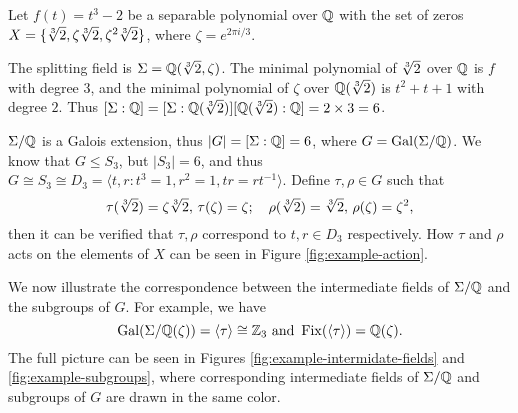 \begin{example}
	
	Let $f(t) = t^3 - 2$ be a separable polynomial over $\mathbb Q$ with the set of zeros $X = \{ \sqrt[3]{2}, \zeta \sqrt[3]{2}, \zeta^2 \sqrt[3]{2} \}$, where $\zeta = e^{2\pi i / 3}$. 
	
	The splitting field is $\Sigma = \mathbb Q(\sqrt[3]{2}, \zeta)$. The minimal polynomial of $\sqrt[3]{2}$ over $\mathbb Q$ is $f$ with degree $3$, and the minimal polynomial of $\zeta$ over $\mathbb Q(\sqrt[3]{2})$ is $t^2 + t + 1$ with degree $2$. Thus $[\Sigma : \mathbb Q] = [\Sigma : \mathbb Q(\sqrt[3]{2})] [\mathbb Q(\sqrt[3]{2}) : \mathbb Q] = 2 \times 3 = 6$. 
	
	$\Sigma / \mathbb Q$ is a Galois extension, thus $|G| = [\Sigma : \mathbb Q] = 6$, where $G = \operatorname{Gal}(\Sigma / \mathbb Q)$. We know that $G \le S_3$, but $|S_3| = 6$, and thus $G \cong S_3 \cong D_3 = \langle t, r : t^3 = 1, r^2 = 1, tr = rt^{-1} \rangle$. Define $\tau, \rho \in G$ such that 
	$$
		\tau(\sqrt[3]{2}) = \zeta \sqrt[3]{2}, \, \tau(\zeta) = \zeta; \quad \rho(\sqrt[3]{2}) = \sqrt[3]{2}, \,  \rho(\zeta) = \zeta ^ 2,
	$$
	then it can be verified that $\tau, \rho$ correspond to $t, r \in D_3$ respectively. How $\tau$ and $\rho$ acts on the elements of $X$ can be seen in Figure \ref{fig:example-action}.
	
	We now illustrate the correspondence between the intermediate fields of $\Sigma / \mathbb Q$ and the subgroups of $G$. For example, we have $$\operatorname{Gal}(\Sigma / \mathbb Q(\zeta)) = \langle \tau \rangle \cong \mathbb Z_3 \text{ and } \operatorname{Fix}(\langle \tau \rangle) = \mathbb Q(\zeta). $$ The full picture can be seen in Figures \ref{fig:example-intermidate-fields} and \ref{fig:example-subgroups}, where corresponding intermediate fields of $\Sigma / \mathbb Q$ and subgroups of $G$ are drawn in the same color. 
	
\end{example}

